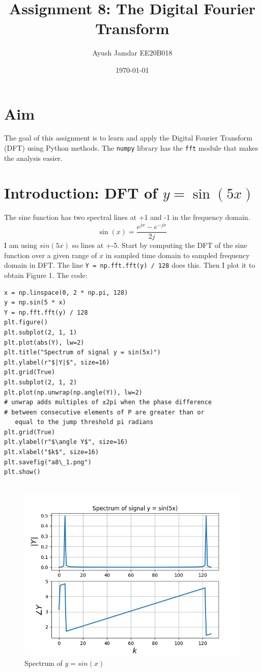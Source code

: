 \documentclass[11pt, a4paper]{article}
\title{Assignment 8: The Digital Fourier Transform} %
\author{Ayush Jamdar EE20B018} %
\date{\today} %
\begin{document}
		
		
\maketitle %
\section{Aim}
The goal of this assignment is to learn and apply the Digital Fourier Transform (DFT) using Python methods. The \texttt{numpy} library has the \texttt{fft} module that makes the analysis easier. 
  
\section{Introduction: DFT of $y=\sin(5x)$}
The sine function has two spectral lines at +1 and -1 in the frequency domain. 
$$\sin(x) = \frac{e^{jx}-e^{-jx}}{2j}$$
I am using $sin(5x)$ so lines at +-5. Start by computing the DFT of the sine function over a given range of $x$ in sampled time domain to sampled frequency domain in DFT. The line \texttt{Y = np.fft.fft(y) / 128} does this. Then I plot it to obtain Figure 1.
The code:
\begin{verbatim}
x = np.linspace(0, 2 * np.pi, 128)
y = np.sin(5 * x)
Y = np.fft.fft(y) / 128
plt.figure()
plt.subplot(2, 1, 1)
plt.plot(abs(Y), lw=2)
plt.title("Spectrum of signal y = sin(5x)")
plt.ylabel(r"$|Y|$", size=16)
plt.grid(True)
plt.subplot(2, 1, 2)
plt.plot(np.unwrap(np.angle(Y)), lw=2)
# unwrap adds multiples of ±2pi when the phase difference
# between consecutive elements of P are greater than or 
   equal to the jump threshold pi radians
plt.grid(True)
plt.ylabel(r"$\angle Y$", size=16)
plt.xlabel("$k$", size=16)
plt.savefig("a8\_1.png")
plt.show()


\end{verbatim} 
 
  \begin{figure}[!tbh]
   	\centering
  \includegraphics[scale=0.5]{a8_1.png} 
    \caption{Spectrum of $y=sin(x)$} 	
   \end{figure} 
\end{document}
